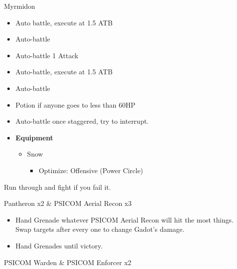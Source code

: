 
	\begin{battle}[0:43]{Myrmidon}
		\begin{itemize}
			\item Auto battle, execute at 1.5 ATB
			\item Auto-battle
			\item Auto-battle 1 Attack
			\item Auto-battle, execute at 1.5 ATB
			\item Auto-battle
			\item Potion if anyone goes to less than 60HP
			\item Auto-battle once staggered, try to interrupt.
		\end{itemize}

	\end{battle}


	\begin{menu}
		\begin{itemize}
			\item \textbf{Equipment}
			      \begin{itemize}
				      \item Snow
				            \begin{itemize}
					            \item Optimize: Offensive (Power Circle)
				            \end{itemize}
			      \end{itemize}
		\end{itemize}
	\end{menu}

	Run through and fight if you fail it.

	\begin{battle}[0:30]{Pantheron x2 \& PSICOM Aerial Recon x3}
		\begin{itemize}
			\item Hand Grenade whatever PSICOM Aerial Recon will hit the most things. Swap targets after every one to change Gadot's damage.
			\item Hand Grenades until victory.
		\end{itemize}

	\end{battle}

	\begin{battle}[0:15]{PSICOM Warden \& PSICOM Enforcer x2}
	\end{battle}

